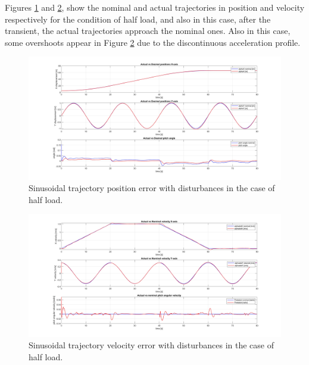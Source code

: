 Figures \ref{fig:Sinusoidal trajectory position error with disturbances in the case of half load} and \ref{fig:Sinusoidal trajectory velocity error with disturbances in the case of half load}, show the nominal and actual trajectories in position and velocity respectively for the condition of half load, and also in this case, after the transient, the actual trajectories approach the nominal ones.
Also in this case, some overshoots appear in Figure \ref{fig:Sinusoidal trajectory velocity error with disturbances in the case of half load} due to the discontinuous acceleration profile.

\begin{figure}
    \centering
    \includegraphics[width=1\linewidth]{Images/Robustness analysis/intermediate load/sinusoidal trajectory/Position_error.jpg}
    \caption{Sinusoidal trajectory position error with disturbances in the case of half load.}
    \label{fig:Sinusoidal trajectory position error with disturbances in the case of half load}
\end{figure}

\begin{figure}
    \centering
    \includegraphics[width=1\linewidth]{Images/Robustness analysis/intermediate load/sinusoidal trajectory/Velocity_error.jpg}
    \caption{Sinusoidal trajectory velocity error with disturbances in the case of half load.}
    \label{fig:Sinusoidal trajectory velocity error with disturbances in the case of half load}
\end{figure}

